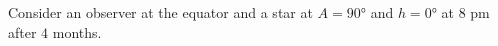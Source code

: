 \documentclass[main.tex]{subfiles}
\begin{document}
\begin{q}{3}
Consider an observer at the equator and a star at $A = \ang{90}$ and $h = \ang{0}$ at 8 pm after $4$ months.
\end{q}

\begin{sol}

\end{sol}
\end{document}

